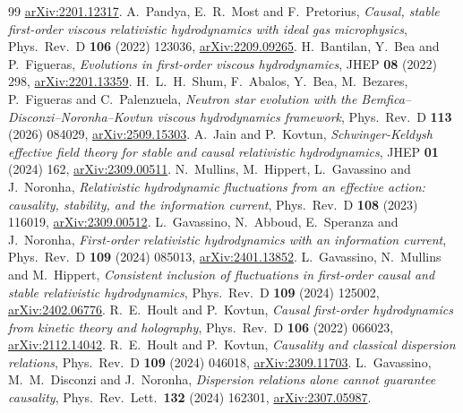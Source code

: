 \begin{thebibliography}{99}
\href{https://arxiv.org/abs/2201.12317}{arXiv:2201.12317}.
A.~Pandya, E.~R.~Most and F.~Pretorius, \emph{Causal, stable first-order
viscous relativistic hydrodynamics with ideal gas microphysics},
Phys.\ Rev.\ D \textbf{106} (2022) 123036,
\href{https://arxiv.org/abs/2209.09265}{arXiv:2209.09265}.
H.~Bantilan, Y.~Bea and P.~Figueras, \emph{Evolutions in first-order
viscous hydrodynamics}, JHEP \textbf{08} (2022) 298,
\href{https://arxiv.org/abs/2201.13359}{arXiv:2201.13359}.
H.~L.~H.~Shum, F.~Abalos, Y.~Bea, M.~Bezares, P.~Figueras and C.~Palenzuela,
\emph{Neutron star evolution with the Bemfica--Disconzi--Noronha--Kovtun
viscous hydrodynamics framework}, Phys.\ Rev.\ D \textbf{113} (2026) 084029,
\href{https://arxiv.org/abs/2509.15303}{arXiv:2509.15303}.
A.~Jain and P.~Kovtun, \emph{Schwinger-Keldysh effective field theory for
stable and causal relativistic hydrodynamics}, JHEP \textbf{01} (2024) 162,
\href{https://arxiv.org/abs/2309.00511}{arXiv:2309.00511}.
N.~Mullins, M.~Hippert, L.~Gavassino and J.~Noronha,
\emph{Relativistic hydrodynamic fluctuations from an effective action:
causality, stability, and the information current},
Phys.\ Rev.\ D \textbf{108} (2023) 116019,
\href{https://arxiv.org/abs/2309.00512}{arXiv:2309.00512}.
L.~Gavassino, N.~Abboud, E.~Speranza and J.~Noronha,
\emph{First-order relativistic hydrodynamics with an information current},
Phys.\ Rev.\ D \textbf{109} (2024) 085013,
\href{https://arxiv.org/abs/2401.13852}{arXiv:2401.13852}.
L.~Gavassino, N.~Mullins and M.~Hippert,
\emph{Consistent inclusion of fluctuations in first-order causal and
stable relativistic hydrodynamics}, Phys.\ Rev.\ D \textbf{109} (2024) 125002,
\href{https://arxiv.org/abs/2402.06776}{arXiv:2402.06776}.
R.~E.~Hoult and P.~Kovtun, \emph{Causal first-order hydrodynamics from
kinetic theory and holography}, Phys.\ Rev.\ D \textbf{106} (2022) 066023,
\href{https://arxiv.org/abs/2112.14042}{arXiv:2112.14042}.
R.~E.~Hoult and P.~Kovtun, \emph{Causality and classical dispersion
relations}, Phys.\ Rev.\ D \textbf{109} (2024) 046018,
\href{https://arxiv.org/abs/2309.11703}{arXiv:2309.11703}.
L.~Gavassino, M.~M.~Disconzi and J.~Noronha, \emph{Dispersion relations
alone cannot guarantee causality}, Phys.\ Rev.\ Lett.\ \textbf{132}
(2024) 162301,
\href{https://arxiv.org/abs/2307.05987}{arXiv:2307.05987}.

\end{thebibliography}
